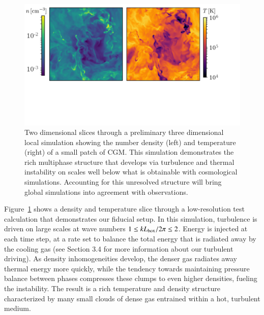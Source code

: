 \documentclass[11pt,letterpaper,english]{article}
\begin{document}
\begin{figure}[h]
 \centering
 \includegraphics[width=1.0\textwidth]{Denstiy_Temperature.pdf} 
\caption{Two dimensional slices through a preliminary three dimensional local simulation showing the number density (left) and temperature (right) of a small patch of CGM. This simulation demonstrates the rich multiphase structure that develops via turbulence and thermal instability on scales well below what is obtainable with cosmological simulations. Accounting for this unresolved structure will bring global simulations into agreement with observations. \label{fig:CGMpatch}}
\end{figure}

Figure~\ref{fig:CGMpatch} shows a density and temperature slice through a low-resolution test calculation that demonstrates our fiducial setup. In this simulation, turbulence is driven on large scales at wave numbers $1 \leq k L_{\rm box}/ 2 \pi \leq 2$. Energy is injected at each time step, at a rate set to balance the total energy that is radiated away by the cooling gas (see Section 3.4 for more information about our turbulent driving). As density inhomogeneities develop, the denser gas radiates away thermal energy more quickly, while the tendency towards maintaining pressure balance between phases compresses these clumps to even higher densities, fueling the instability. The result is a rich temperature and density structure characterized by many small clouds of dense gas entrained within a hot, turbulent medium.
\end{document}

